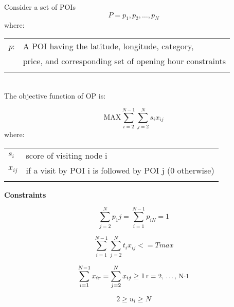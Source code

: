 


\setlength{\tabcolsep}{20pt}

Consider a set of POIs \[P = {p_1,p_2,\ldots,p_N}\]
where:
\\

\begin{tabular}{l l}


\textit{p}:  &  A POI having the latitude, longitude, category,\\
 & price, and corresponding set of opening hour constraints \\
 &\\
\end{tabular}
\\
The objective function of OP is:

\[ \text{MAX}  \sum_{i=2}^{N-1} \sum_{j=2}^{N} {s_i}{x_{ij}} \]
where:
\\
\begin{tabular}{l l}
\textit{$s_i$} & score of visiting node i \\
\textit{$x_{ij}$} & if a visit by POI i is followed by POI j (0 otherwise)\\

                  & \\
\end{tabular}


\textbf{Constraints} 

\begin{multicols}{2}
\begin{equation} 
    \label{constraintOne}
    \sum_{j=2}^{N} p_1j = \sum_{i=1}^{N-1} p_{iN}= 1
\end{equation}

\begin{equation} 
    \label{constraintTwo}
    \sum_{i=1}^{N-1} \sum_{j=2}^{N} t_{i}x_{ij}<= Tmax
\end{equation}


\end{multicols}


\begin{equation} 
    \label{constraintThree}
    \sum_{i=1}^{N-1} x_{ir} = \sum_{j=2}^{N} x_{ij} \geq 1 \, \text{\small{r = 2, \ldots, N-1}}
\end{equation}

\begin{equation} 
    \label{constraintFour}
    2 \geq u_i \geq N 
\end{equation}

